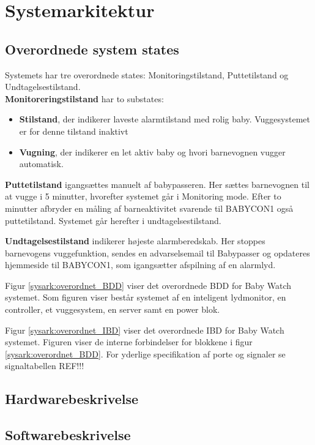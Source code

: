 \chapter{Systemarkitektur}



\section{Overordnede system states}


Systemets har tre overordnede states: Monitoringstilstand, Puttetilstand og Undtagelsestilstand. \\\textbf{Monitoreringstilstand} har to substates: 
\begin{itemize}
	\item \textbf{Stilstand}, der indikerer laveste alarmtilstand med rolig baby. Vuggesystemet er for denne tilstand inaktivt
	\item \textbf{Vugning}, der indikerer en let aktiv baby og hvori barnevognen vugger automatisk.
\end{itemize}

\textbf{Puttetilstand} igangsættes manuelt af babypasseren. Her sættes barnevognen til at vugge i 5 minutter, hvorefter systemet går i Monitoring mode. Efter to minutter afbryder en måling af barneaktivitet svarende til BABYCON1 også puttetilstand. Systemet går herefter i undtagelsestilstand.

\textbf{Undtagelsestilstand} indikerer højeste alarmberedskab. Her stoppes barnevogens vuggefunktion, sendes en advarselsemail til Babypasser og opdateres hjemmeside til BABYCON1, som igangsætter afspilning af en alarmlyd. 

Figur \ref{sysark:overordnet_BDD} viser det overordnede BDD for Baby Watch systemet. Som figuren viser består systemet af en inteligent lydmonitor, en controller, et vuggesystem, en server samt en power blok. 


Figur \ref{sysark:overordnet_IBD} viser det overordnede IBD for Baby Watch systemet.  Figuren viser de interne forbindelser for blokkene i figur \ref{sysark:overordnet_BDD}. For yderlige specifikation af porte og signaler se signaltabellen REF!!!



\newpage
\section{Hardwarebeskrivelse}


\clearpage
\section{Softwarebeskrivelse}



